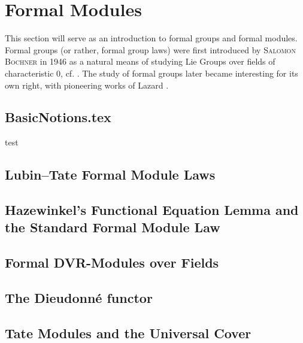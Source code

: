 \documentclass[../main.tex]{subfiles}
\begin{document}
\section{Formal Modules}
This section will serve as an introduction to formal groups and 
formal modules. Formal groups (or rather, formal group laws) were first
introduced by \textsc{Salomon Bochner} in 1946 as a natural means of studying Lie
Groups over fields of characteristic $0$, cf. \cite{Bochner1946FGrps}. 
The study of formal groups later became interesting for its own right, 
with pioneering works of Lazard \cite{Lazard1955FGrps}. 

\subsection{BasicNotions.tex} 
\label{sub:Basic Notions}

test

\subsection{Lubin--Tate Formal Module Laws} %
\label{sub:Lubin--Tate Formal Module Laws}


%

\subsection{Hazewinkel's Functional Equation Lemma and the Standard Formal
Module Law} %
\label{sub:Hazewinkels FuncEq and the Standard Formal Module}


\subsection{Formal DVR-Modules over Fields} %
\label{sub:Formal DVR-Modules over Fields}


\subsection{The Dieudonn\'e functor} %
\label{sub:The Dieudonne functor}


\subsection{Tate Modules and the Universal Cover} %
\label{sub:Tate Modules and the Universal Cover}

\end{document}
